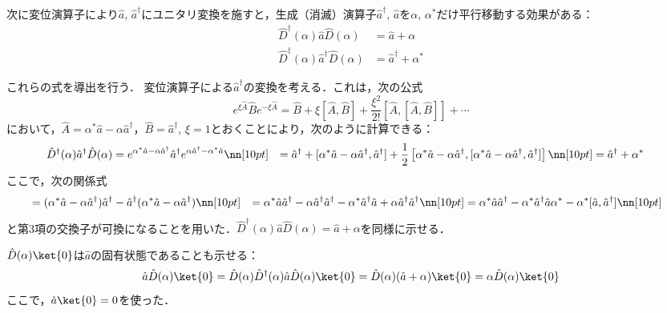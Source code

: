 次に変位演算子により$\hat{a}$, $\hat{a}^\dag$にユニタリ変換を施すと，生成（消滅）演算子$\hat{a}^\dagger$, $\hat{a}$を$\alpha$, $\alpha^\ast$だけ平行移動する効果がある：
\begin{align}
    \hat{D}^\dagger(\alpha)\hat{a}\hat{D}(\alpha)&=\hat{a} + \alpha\\[10pt]
    \hat{D}^\dagger(\alpha)\hat{a}^\dagger\hat{D}(\alpha)&=\hat{a}^\dagger + \alpha^\ast
\end{align}

これらの式を導出を行う．
変位演算子による$\hat{a}^{\dagger}$の変換を考える．これは，次の公式
\begin{equation}
    e^{\xi\hat{A}}\hat{B}e^{-\xi\hat{A}}
    =\hat{B}+\xi[\hat{A},\hat{B}]+\frac{\xi^2}{2!}[\hat{A},[\hat{A},\hat{B}]]+\cdots
\end{equation}
において，$\hat{A}=\alpha^\ast\hat{a}-\alpha\hat{a}^{\dagger}$，$\hat{B}=\hat{a}^{\dagger}$, $\xi=1$とおくことにより，次のように計算できる：
\begin{align}
    \hat{D}^{\dagger}(\alpha)\hat{a}^{\dagger}\hat{D}(\alpha)
    &=e^{\alpha^\ast\hat{a}-\alpha\hat{a}^{\dagger}}
    \hat{a}^{\dagger}
    e^{\alpha\hat{a}^{\dagger}-\alpha^\ast\hat{a}}\nn[10pt]
    &=\hat{a}^{\dagger}
    +[\alpha^\ast\hat{a}-\alpha\hat{a}^{\dagger},\hat{a}^{\dagger}]
    +\frac{1}{2}\left[\alpha^\ast\hat{a}-\alpha\hat{a}^{\dagger},[\alpha^\ast\hat{a}-\alpha\hat{a}^{\dagger},\hat{a}^{\dagger}]\right]\nn[10pt]
    &=\hat{a}^{\dagger}+\alpha^{\ast}
\end{align}
ここで，次の関係式
\begin{align}
    [\alpha^\ast\hat{a}-\alpha\hat{a}^{\dagger},\hat{a}^{\dagger}]
    &=(\alpha^\ast\hat{a}-\alpha\hat{a}^{\dagger})\hat{a}^{\dagger}
    -\hat{a}^{\dagger}(\alpha^\ast\hat{a}-\alpha\hat{a}^{\dagger})\nn[10pt]
    &=\alpha^\ast\hat{a}\hat{a}^{\dagger}-\alpha\hat{a}^{\dagger}\hat{a}^{\dagger}
    -\alpha^\ast\hat{a}^{\dagger}\hat{a}+\alpha\hat{a}^{\dagger}\hat{a}^{\dagger}\nn[10pt]
    &=\alpha^\ast\hat{a}\hat{a}^{\dagger}
    -\alpha^\ast\hat{a}^{\dagger}\hat{a}
    \alpha^\ast-\alpha^\ast[\hat{a},\hat{a}^{\dagger}]\nn[10pt]
\end{align}
と第3項の交換子が可換になることを用いた．$\hat{D}^\dagger(\alpha)\hat{a}\hat{D}(\alpha)=\hat{a}+\alpha$を同様に示せる．

$\hat{D}(\alpha)\ket{0}$は$\hat{a}$の固有状態であることも示せる：
\begin{equation}
    \hat{a}\hat{D}(\alpha)\ket{0}
    =\hat{D}(\alpha)\hat{D}^\dagger(\alpha)\hat{a}\hat{D}(\alpha)\ket{0}
    =\hat{D}(\alpha)(\hat{a}+\alpha)\ket{0}
    =\alpha\hat{D}(\alpha)\ket{0}
\end{equation}
ここで，$\hat{a}\ket{0}=0$を使った．
